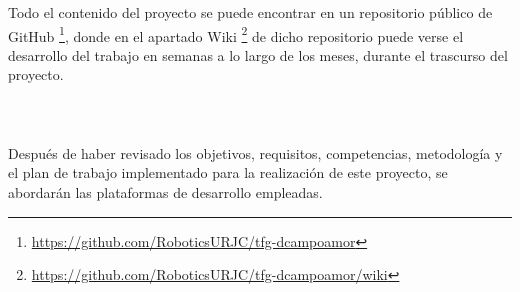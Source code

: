\pagebreak
Todo el contenido del proyecto se puede encontrar en un repositorio público de GitHub \footnote{\url{https://github.com/RoboticsURJC/tfg-dcampoamor}}, donde en el apartado Wiki \footnote{\url{https://github.com/RoboticsURJC/tfg-dcampoamor/wiki}} de dicho repositorio puede verse el desarrollo del trabajo en semanas a lo largo de los meses, durante el trascurso del proyecto.\\
\\
\\
\\
Después de haber revisado los objetivos, requisitos, competencias, metodología y el plan de trabajo implementado para la realización de este proyecto, se abordarán las plataformas de desarrollo empleadas.

